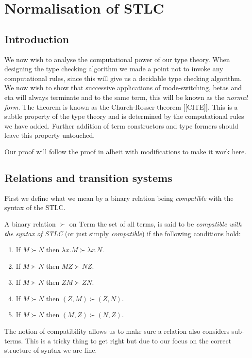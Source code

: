 \section{Normalisation of STLC}

\subsection{Introduction}
We now wish to analyse the computational power of our type theory. When designing the type checking algorithm we made a point not to invoke any computational rules, since this will give us a decidable type checking algorithm. We now wish to show that successive applications of mode-switching, betas and eta will always terminate and to the same term, this will be known as the \emph{normal form}. The theorem is known as the Church-Rosser theorem [[CITE]]. This is a subtle property of the type theory and is determined by the computational rules we have added. Further addition of term constructors and type formers should leave this property untouched.

Our proof will follow the proof in \cite[p. 67]{Sorensen} albeit with modifications to make it work here. 

\subsection{Relations and transition systems}

First we define what we mean by a binary relation being \emph{compatible} with the syntax of the STLC.
\begin{defin}
    A binary relation $\succ$ on $\mathrm{Term}$ the set of all terms, is said to be \emph{compatible with the syntax of STLC} (or just simply \emph{compatible}) if the following conditions hold:
    \begin{enumerate}
        \item If $M \succ N$ then $\lambda x . M \succ \lambda x . N$.
        \item If $M \succ N$ then $M Z \succ N Z$.
        \item If $M \succ N$ then $Z M \succ Z N$.
        \item If $M \succ N$ then $(Z,M) \succ (Z,N)$.
        \item If $M \succ N$ then $(M, Z) \succ (N, Z)$.
    \end{enumerate}
\end{defin}

\begin{remark}
    The notion of compatibility allows us to make sure a relation also considers sub-terms. This is a tricky thing to get right but due to our focus on the correct structure of syntax we are fine.
\end{remark}

